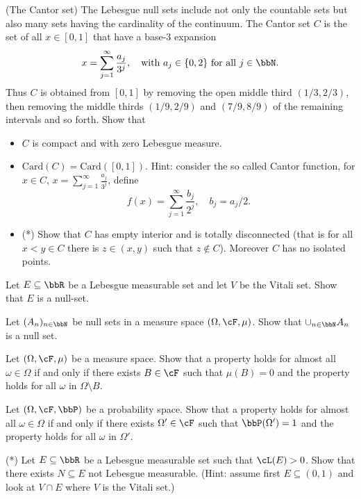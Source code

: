\begin{problem}(The Cantor set) The Lebesgue null sets include not only the countable sets but also many sets having the cardinality of the continuum. The Cantor set $C$ is the set of all $x \in [0, 1]$ that have a base-$3$ expansion
\begin{equation*}
    x = \sum_{j=1}^\infty \frac{a_j}{3^j},\quad \text{with $a_j\in\{0,2\}$ for all $j\in \bbN$.}
\end{equation*} 
Thus $C$ is obtained from $[0,1]$ by removing the open middle third $(1/3,2/3)$, then removing the middle thirds $(1/9,2/9)$ and $(7/9,8/9)$ of the remaining intervals and so forth.
Show that 
\begin{itemize}
    \item $C$ is compact and with zero Lebesgue measure.
    \item $\mathrm{Card}(C) = \mathrm{Card}([0,1])$. Hint: consider the so called Cantor function, for $x\in C$, $x=\sum_{j=1}^\infty \frac{a_j}{3^j}$, define
    \begin{equation*}
        f(x) =\sum_{j=1}^\infty \frac{b_j}{2^j},\quad b_j=a_j/2.
    \end{equation*}
    \item (*) Show that $C$ has empty interior and is totally disconnected (that is for all $x<y\in C$ there is $z\in(x,y)$ such that $z\notin C$). Moreover $C$ has no isolated points.
\end{itemize}
\end{problem}

\begin{problem}
    Let $E\subseteq \bbR$ be a Lebesgue measurable set and let $V$ be the Vitali set. Show that $E$ is a null-set.
\end{problem}

\begin{problem}
    Let $(A_n)_{n\in \bbN}$ be null sets in a measure space $(\Omega,\cF,\mu)$. Show that $\cup_{n\in \bbN} A_n$ is a null set.
\end{problem}

\begin{problem}
    Let $(\Omega,\cF,\mu)$ be a measure space. Show that a property holds for almost all $\omega\in \Omega$ if and only if there exists $B \in \cF$ such that $\mu(B)=0$ and the property holds for all $\omega$ in $\Omega\setminus B$.
\end{problem}

\begin{problem}
    Let $(\Omega,\cF,\bbP)$ be a probability space. Show that a property holds for almost all $\omega\in \Omega$ if and only if there exists $\Omega'\in \cF$ such that $\bbP(\Omega')=1$ and the property holds for all $\omega$ in $\Omega'$.
\end{problem}

\begin{problem}(*) Let $E\subseteq \bbR$ be a Lebesgue measurable set such that $\cL(E)>0$. Show that there exists $N\subseteq E$ not Lebesgue measurable. (Hint: assume first $E\subseteq (0,1)$ and look at $V\cap E$ where $V$ is the Vitali set.) 
\end{problem}

